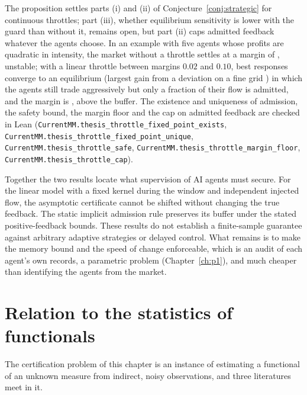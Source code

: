 The proposition settles parts (i) and (ii) of Conjecture~\ref{conj:strategic} for continuous throttles; part (iii), whether equilibrium sensitivity is lower with the guard than without it, remains open, but part (ii) caps admitted feedback whatever the agents choose. In an example with five agents whose profits are quadratic in intensity, the market without a throttle settles at a margin of \AGnoThrM{}, unstable; with a linear throttle between margins $0.02$ and $0.10$, best responses converge to an equilibrium (largest gain from a deviation on a fine grid \AGthrGain{}) in which the agents still trade aggressively but only a fraction \AGthrAlpha{} of their flow is admitted, and the margin is \AGthrM{}, above the buffer. The existence and uniqueness of admission, the safety bound, the margin floor and the cap on admitted feedback are checked in Lean (\nolinkurl{CurrentMM.thesis_throttle_fixed_point_exists}, \nolinkurl{CurrentMM.thesis_throttle_fixed_point_unique}, \nolinkurl{CurrentMM.thesis_throttle_safe}, \nolinkurl{CurrentMM.thesis_throttle_margin_floor}, \nolinkurl{CurrentMM.thesis_throttle_cap}).

Together the two results locate what supervision of AI agents must secure. For the linear model with a fixed kernel during the window and independent injected flow, the asymptotic certificate cannot be shifted without changing the true feedback. The static implicit admission rule preserves its buffer under the stated positive-feedback bounds. These results do not establish a finite-sample guarantee against arbitrary adaptive strategies or delayed control. What remains is to make the memory bound and the speed of change enforceable, which is an audit of each agent's own records, a parametric problem (Chapter~\ref{ch:p1}), and much cheaper than identifying the agents from the market.

\section{Relation to the statistics of functionals}\label{sec:fw_literature}

The certification problem of this chapter is an instance of estimating a functional of an unknown measure from indirect, noisy observations, and three literatures meet in it.

